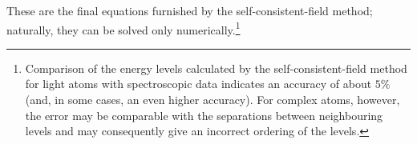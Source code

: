These are the final equations furnished by the self-consistent-field method; naturally, they can be solved only numerically.\footnote{Comparison of the energy levels calculated by the self-consistent-field method for light atoms with spectroscopic data indicates an accuracy of about $5\%$ (and, in some cases, an even higher accuracy). For complex atoms, however, the error may be comparable with the separations between neighbouring levels and may consequently give an incorrect ordering of the levels.}
